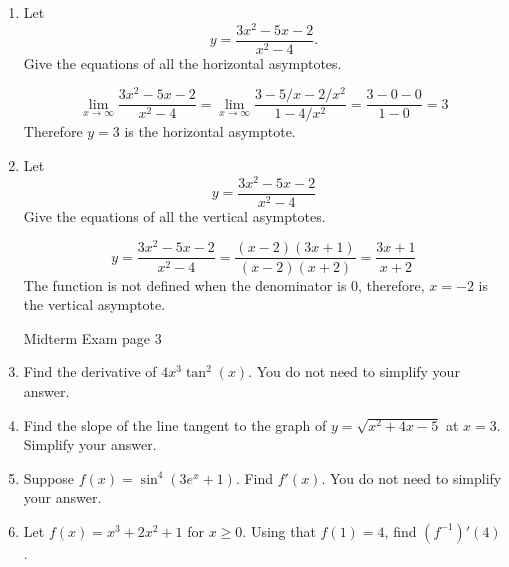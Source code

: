 \documentclass[12pt]{article}
\begin{document}
\begin{enumerate}
\bigskip

\item Let
\[
y = \frac{3x^2 - 5x - 2}{x^2 - 4}.
\]
Give the equations of all the horizontal asymptotes.

\medskip
{}
\[
\lim_{x\rightarrow \infty} \frac{3x^2 - 5x - 2}{x^2 - 4} =
\lim_{x\rightarrow \infty} \frac{3 - 5/x - 2/x^2}{1 - 4/x^2} =
\frac{3-0-0}{1-0}
=3
\]
Therefore $y = 3$ is the horizontal asymptote.

\bigskip

\item Let
\[
y = \frac{3x^2 - 5x - 2}{x^2 - 4}
\]
Give the equations of all the vertical asymptotes.

\medskip
{}
\[
y = \frac{3x^2 - 5x - 2}{x^2 - 4} = \frac{(x-2)(3x+1)}{(x-2)(x+2)}
=\frac{3x+1}{x+2}
\]
The function is not defined when the denominator is 0, therefore, $x = -2$ is
the vertical asymptote. 
\bigskip

\newpage

\noindent Midterm Exam \hfill page 3

\item Find the derivative of $4x^3 \tan^2(x)$. 
You do not need to simplify your answer.

\medskip
{}
\bigskip

\item Find the slope of the line tangent to the graph of 
$y = \sqrt{x^2 + 4x - 5}$ at $x = 3$. Simplify your answer.

\medskip
{}
\bigskip

\item Suppose $f(x) = \sin^4(3e^x + 1)$. Find $f'(x)$. 
You do not need to simplify your answer.

\medskip
{}
\bigskip

\item Let $f(x) = x^3 + 2x^2 + 1$ for $x \geq 0$. 
Using that $f(1) = 4$, find $(f^{-1})'(4)$.

\medskip
{}
\bigskip

\end{enumerate}
\end{document}
